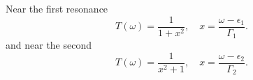 \documentclass{article}
\begin{document}
Near the first resonance
\begin{equation}
T(\omega) = \frac{1}{1+x^2}, \quad x = \frac{\omega-\epsilon_1}{\Gamma_1} .
\label{eq:t1}
\end{equation}
and near the second
\begin{equation}
T(\omega) = \frac{1}{x^2+1}, \quad x = \frac{\omega-\epsilon_2}{\Gamma_2} .
\label{eq:t2}
\end{equation}
\end{document}
